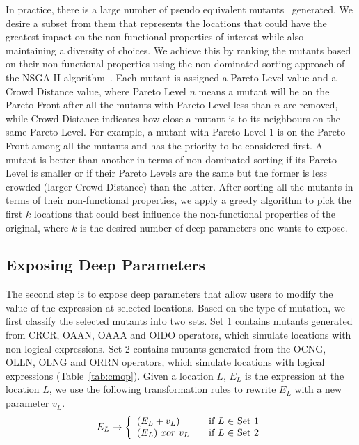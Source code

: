 In practice, there is a large number of pseudo equivalent mutants~\cite{ MikeEQ2015,weimerGPEM14, Yao:2014:SES:2568225.2568265} generated. We desire a subset from them that represents the locations that could have the greatest impact on the non-functional properties of interest while also maintaining a diversity of choices.  
We achieve this by ranking the mutants based on their non-functional properties using the non-dominated sorting approach of the NSGA-II algorithm~\cite{996017}. Each mutant is assigned a Pareto Level value and a Crowd Distance value, where Pareto Level $n$ means a mutant will be on the Pareto Front after all the mutants with Pareto Level less than $n$ are removed, while Crowd Distance indicates how close a mutant is to its neighbours on the same Pareto Level. For example, a mutant with Pareto Level $1$ is on the Pareto Front among all the mutants and has the priority to be considered first. A mutant is better than another in terms of non-dominated sorting if its Pareto Level is smaller or if their Pareto Levels are the same but the former is less crowded (larger Crowd Distance) than the latter. After sorting all the mutants in terms of their non-functional properties, we apply a greedy algorithm to pick the first $k$ locations that could best influence the non-functional properties of the original, where $k$ is the desired number of deep parameters one wants to expose.
\vspace{-0.8em}
\subsection{Exposing Deep Parameters}
\label{exposing}
The second step is to expose deep parameters that allow users to modify the value of the expression at selected locations. Based on the type of mutation, we first classify the selected mutants into two sets. Set 1 contains mutants generated from CRCR, OAAN, OAAA and OIDO operators, which simulate locations with non-logical expressions. Set 2 contains mutants generated from the OCNG, OLLN, OLNG and ORRN operators, which simulate locations with logical expressions (Table~\ref{tab:cmop}). 
Given a location $L$, $E_L$ is the expression at the location $L$, we use the following transformation rules to rewrite $E_L$ with a new parameter $v_L$.
\vspace{-0.2em}
\begin{equation}
 E_L \rightarrow \left\{
  \begin{array}{l l}
    (E_L + v_L) & \quad \text{if $L$ $\in$ Set 1}\\
    (E_L) \ xor \ v_L & \quad \text{if $L$ $\in$ Set 2}
    \end{array} \right.
\end{equation}

